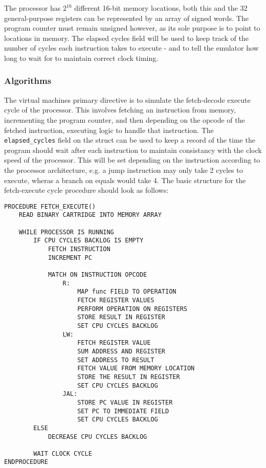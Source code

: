 The processor has $2^{16}$ different 16-bit memory locations, both this and the 32 general-purpose registers can be  represented by an array of signed words. The program counter must remain unsigned however, as its sole purpose is to point to locations in memory. The elapsed cycles field will be used to keep track of the number of cycles each instruction takes to execute - and to tell the emulator how long to wait for to maintain correct clock timing.

\subsubsection{Algorithms}

The virtual machines primary directive is to simulate the fetch-decode execute cycle of the processor. This involves fetching an instruction from memory, incrementing the program counter, and then depending on the opcode of the fetched instruction, executing logic to handle that instruction. The \texttt{elapsed\_cycles} field on the struct can be used to keep a record of the time the program should wait after each instruction to maintain consistancy with the clock speed of the processor. This will be set depending on the instruction according to the processor architecture, e.g. a jump instruction may only take 2 cycles to execute, wheras a branch on equals would take 4. The basic structure for the fetch-execute cycle procedure should look as follows:

\begin{lstlisting}
PROCEDURE FETCH_EXECUTE()
    READ BINARY CARTRIDGE INTO MEMORY ARRAY

    WHILE PROCESSOR IS RUNNING
        IF CPU CYCLES BACKLOG IS EMPTY
            FETCH INSTRUCTION 
            INCREMENT PC

            MATCH ON INSTRUCTION OPCODE 
                R: 
                    MAP func FIELD TO OPERATION 
                    FETCH REGISTER VALUES 
                    PERFORM OPERATION ON REGISTERS 
                    STORE RESULT IN REGISTER 
                    SET CPU CYCLES BACKLOG 
                LW:
                    FETCH REGISTER VALUE
                    SUM ADDRESS AND REGISTER
                    SET ADDRESS TO RESULT
                    FETCH VALUE FROM MEMORY LOCATION
                    STORE THE RESULT IN REGISTER
                    SET CPU CYCLES BACKLOG
                JAL:
                    STORE PC VALUE IN REGISTER
                    SET PC TO IMMEDIATE FIELD
                    SET CPU CYCLES BACKLOG
        ELSE 
            DECREASE CPU CYCLES BACKLOG

        WAIT CLOCK CYCLE
ENDPROCEDURE
\end{lstlisting}

